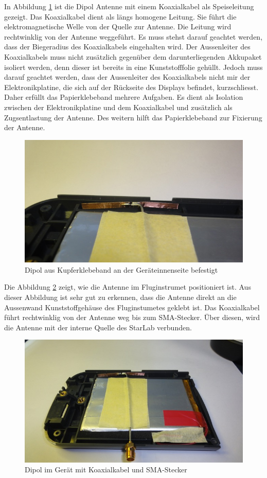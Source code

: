 \newpage
In Abbildung \ref{fig:DipolausKupferbandGeraeteinnenseite} ist  die Dipol Antenne mit einem Koaxialkabel als Speiseleitung gezeigt. Das Koaxialkabel dient als längs homogene Leitung. Sie führt die elektromagnetische Welle von der Quelle zur Antenne. Die Leitung wird rechtwinklig von der Antenne weggeführt. Es muss stehst darauf geachtet werden, dass der Biegeradius des Koaxialkabels eingehalten wird. Der Aussenleiter des Koaxialkabels muss nicht zusätzlich gegenüber dem darunterliegenden Akkupaket isoliert werden, denn dieser ist bereits in eine Kunststofffolie gehüllt. Jedoch muss darauf geachtet werden, dass der Aussenleiter des Koaxialkabels nicht mir der Elektronikplatine, die sich auf der Rückseite des Displays befindet, kurzschliesst. Daher erfüllt das Papierklebeband mehrere Aufgaben. Es dient als Isolation zwischen der Elektronikplatine und dem Koaxialkabel und zusätzlich als Zugsentlastung der Antenne. Des weitern hilft das Papierklebeband zur Fixierung der Antenne.\\
\begin{figure}[!ht]
	\centering
	\includegraphics[width=15cm]{content/bilder/Implementierung/DipolIMGeraet.jpg}%
	\caption{Dipol aus Kupferklebeband an der Geräteinnenseite befestigt}
	\label{fig:DipolausKupferbandGeraeteinnenseite}
\end{figure}
\clearpage
\newpage
Die Abbildung \ref{fig:DipolimGeraet} zeigt, wie die Antenne im Fluginstrumet positioniert ist. Aus dieser Abbildung ist sehr gut zu erkennen, dass die Antenne direkt an die Aussenwand Kunststoffgehäuse  des Fluginstumetes geklebt ist. Das Koaxialkabel führt rechtwinklig von der Antenne weg bis zum SMA-Stecker. Über diesen, wird die Antenne mit der interne Quelle des StarLab verbunden.\\
\begin{figure}[!ht]
	\centering
	\includegraphics[width=15cm]{content/bilder/Implementierung/DipolKabelGeraet.jpg}%
	\caption{Dipol im Gerät mit Koaxialkabel und SMA-Stecker}
	\label{fig:DipolimGeraet}
\end{figure}







